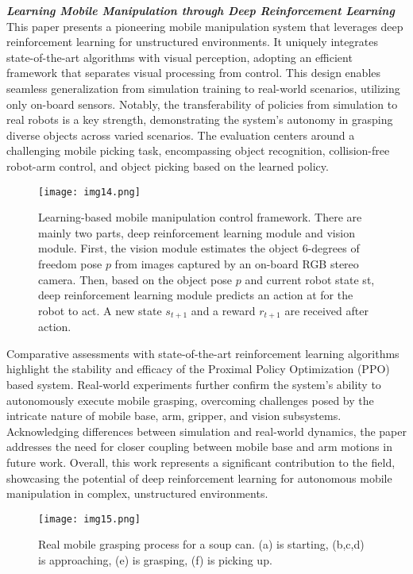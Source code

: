 \textbf{\textit{Learning Mobile Manipulation through Deep
		Reinforcement Learning}} \quad
\cite{wang2020drlmanipulation}
This paper presents a pioneering mobile manipulation system that leverages deep
reinforcement learning for unstructured environments. It uniquely integrates state-of-the-art
algorithms with visual perception, adopting an efficient framework that separates
visual processing from control. This design enables seamless generalization from simulation
training to real-world scenarios, utilizing only on-board sensors.
Notably, the transferability of policies from simulation to real robots is a key strength,
demonstrating the system's autonomy in grasping diverse objects across varied scenarios.
The evaluation centers around a challenging mobile picking task, encompassing object recognition,
collision-free robot-arm control, and object picking based on the learned policy.


\begin{figure}[H]
	\centering
	\texttt{[image: img14.png]}
	\captionsetup{width=1\linewidth}
	\caption{Learning-based mobile manipulation control framework. There are mainly two parts,
		deep reinforcement learning module and vision module. First, the vision module estimates
		the object 6-degrees of freedom pose $p$ from images captured by an on-board RGB stereo camera.
		Then, based on the object pose $p$ and current robot state st, deep reinforcement learning
		module predicts an action at for the robot to act. A new state $s_{t+1}$ and a reward
		$r_{t+1}$ are received after action.\cite{wang2020drlmanipulation}}
	\label{fig:img14}
\end{figure}

Comparative assessments with state-of-the-art reinforcement learning algorithms highlight
the stability and efficacy of the Proximal Policy Optimization (PPO) based system.
Real-world experiments further confirm the system's ability to autonomously execute mobile grasping,
overcoming challenges posed by the intricate nature of mobile base, arm, gripper, and vision subsystems.
Acknowledging differences between simulation and real-world dynamics, the paper addresses
the need for closer coupling between mobile base and arm motions in future work. Overall,
this work represents a significant contribution to the field, showcasing the potential of
deep reinforcement learning for autonomous mobile manipulation in complex, unstructured environments.

\begin{figure}[H]
	\centering
	\texttt{[image: img15.png]}
	\captionsetup{width=1\linewidth}
	\caption{Real mobile grasping process for a soup can.
	(a) is starting, (b,c,d) is approaching, (e) is grasping, (f) is picking up.
	\cite{wang2020drlmanipulation}}
	\label{fig:img15}
\end{figure}

